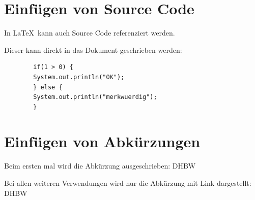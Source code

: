 


\section{Einfügen von Source Code}\label{section:source_code}

\lstset{language=Java}

    In \LaTeX\ kann auch Source Code referenziert werden.

    Dieser kann direkt in das Dokument geschrieben werden:

    \begin{lstlisting}
        if(1 > 0) {
        System.out.println("OK"); 
        } else {
        System.out.println("merkwuerdig");
        }
    \end{lstlisting}

\section{Einfügen von Abkürzungen}\label{section:abkuerzungen}

Beim ersten mal wird die Abkürzung ausgeschrieben: \ac{DHBW}

Bei allen weiteren Verwendungen wird nur die Abkürzung mit Link dargestellt: \ac{DHBW}

